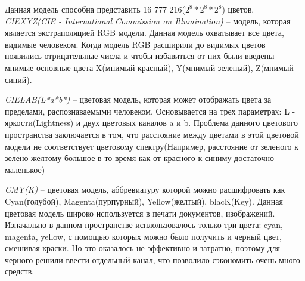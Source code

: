 \begin{figure}[ht!]
\end{figure}

Данная модель способна представить 16 777 216(\(2^8 * 2^8 * 2^8\)) цветов.\\

\textit{CIEXYZ(CIE - International Commission on Illumination)} -- модель, которая является экстраполяцией RGB модели. Данная модель охватывает все цвета, видимые человеком. Когда модель RGB расширили до видимых цветов появились отрицательные числа и чтобы избавиться от них были введены мнимые основные цвета X(мнимый красный), Y(мнимый зеленый), Z(мнимый синий).

\textit{CIELAB(L*a*b*)} -- цветовая модель, которая может отображать цвета за пределами, распознаваемыми человеком. Основывается на трех параметрах: L - яркости(Lightness) и двух цветовых каналов a и b. Проблема данного цветового пространства заключается в том, что расстояние между цветами в этой цветовой модели не соответствует цветовому спектру(Например, расстояние от зеленого к зелено-желтому большое в то время как от красного к синиму достаточно маленькое)

\begin{figure}[ht!]
\end{figure}

\textit{CMY(K)} -- цветовая модель, аббревиатуру которой можно расшифровать как Cyan(голубой), Magenta(пурпурный), Yellow(желтый), blacK(Key). Данная цветовая модель широко используется в печати документов, изображений. Изначально в данном пространстве исплользовалось только три цвета: cyan, magenta, yellow, с помощью которых можно было получить и черный цвет, смешивая краски. Но это оказалось не эффективно и затратно, поэтому для черного решили ввести отдельный канал, что позволило сэкономить очень много средств.

